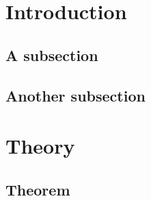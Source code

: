 \documentclass[10pt,twoside, a4paper]{article}
\begin{document}
\section{Introduction}
\blindtext
\subsection{A subsection} 
\blindtext


\newpage
\subsection{Another subsection} 
\blindtext

\newpage
\section{Theory}
\blindtext

\subsection{Theorem}
\blindtext
\end{document}
